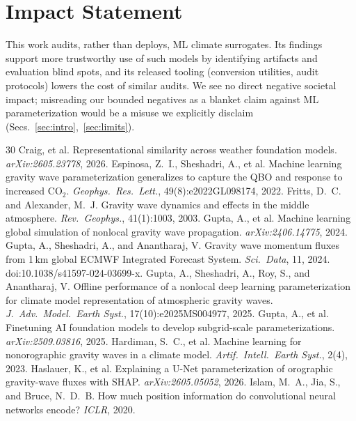 \documentclass[10pt,twocolumn]{article}
\begin{document}
\section*{Impact Statement}
This work audits, rather than deploys, ML climate surrogates. Its findings support more trustworthy use of such models by identifying artifacts and evaluation blind spots, and its released tooling (conversion utilities, audit protocols) lowers the cost of similar audits. We see no direct negative societal impact; misreading our bounded negatives as a blanket claim against ML parameterization would be a misuse we explicitly disclaim (Secs.~\ref{sec:intro},~\ref{sec:limits}).

\begin{thebibliography}{30}\small
{} Craig, et al. Representational similarity across weather foundation models. \emph{arXiv:2605.23778}, 2026.
 Espinosa, Z.~I., Sheshadri, A., et al. Machine learning gravity wave parameterization generalizes to capture the QBO and response to increased CO$_2$. \emph{Geophys.\ Res.\ Lett.}, 49(8):e2022GL098174, 2022.
 Fritts, D.~C. and Alexander, M.~J. Gravity wave dynamics and effects in the middle atmosphere. \emph{Rev.\ Geophys.}, 41(1):1003, 2003.
 Gupta, A., et al. Machine learning global simulation of nonlocal gravity wave propagation. \emph{arXiv:2406.14775}, 2024.
 Gupta, A., Sheshadri, A., and Anantharaj, V. Gravity wave momentum fluxes from 1\,km global ECMWF Integrated Forecast System. \emph{Sci.\ Data}, 11, 2024. doi:10.1038/s41597-024-03699-x.
 Gupta, A., Sheshadri, A., Roy, S., and Anantharaj, V. Offline performance of a nonlocal deep learning parameterization for climate model representation of atmospheric gravity waves. \emph{J.\ Adv.\ Model.\ Earth Syst.}, 17(10):e2025MS004977, 2025.
 Gupta, A., et al. Finetuning AI foundation models to develop subgrid-scale parameterizations. \emph{arXiv:2509.03816}, 2025.
 Hardiman, S.~C., et al. Machine learning for nonorographic gravity waves in a climate model. \emph{Artif.\ Intell.\ Earth Syst.}, 2(4), 2023.
 Haslauer, K., et al. Explaining a U-Net parameterization of orographic gravity-wave fluxes with SHAP. \emph{arXiv:2605.05052}, 2026.
 Islam, M.~A., Jia, S., and Bruce, N.~D.~B. How much position information do convolutional neural networks encode? \emph{ICLR}, 2020.

\end{thebibliography}
\end{document}
